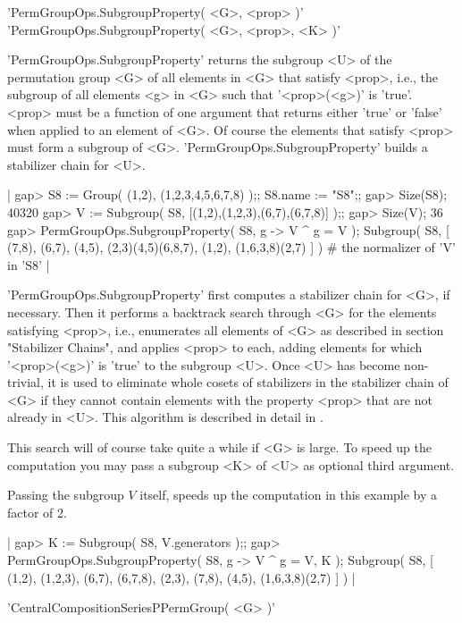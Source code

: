 'PermGroupOps.SubgroupProperty( <G>, <prop> )' \\
'PermGroupOps.SubgroupProperty( <G>, <prop>, <K> )'

'PermGroupOps.SubgroupProperty'   returns  the   subgroup  <U>   of   the
permutation group  <G> of  all elements in <G> that satisfy <prop>, i.e.,
the  subgroup  of  all elements  <g> in <G>  such  that  '<prop>(<g>)' is
'true'.  <prop> must be a function of  one  argument  that returns either
'true' or 'false'  when applied  to an element  of  <G>.  Of  course  the
elements   that   satisfy   <prop>   must  form   a   subgroup  of   <G>.
'PermGroupOps.SubgroupProperty' builds a stabilizer chain for <U>.

|    gap> S8 := Group( (1,2), (1,2,3,4,5,6,7,8) );;  S8.name := "S8";;
    gap> Size(S8);
    40320
    gap> V := Subgroup( S8, [(1,2),(1,2,3),(6,7),(6,7,8)] );;
    gap> Size(V);
    36
    gap> PermGroupOps.SubgroupProperty( S8, g -> V ^ g = V );
    Subgroup( S8, [ (7,8), (6,7), (4,5), (2,3)(4,5)(6,8,7), (1,2),
      (1,6,3,8)(2,7) ] )
    # the normalizer of 'V' in 'S8' |

'PermGroupOps.SubgroupProperty'  first  computes a  stabilizer chain  for
<G>, if necessary.  Then it performs a backtrack search  through  <G> for
the elements  satisfying <prop>, i.e.,  enumerates all elements of <G> as
described in  section  "Stabilizer Chains",  and  applies <prop> to each,
adding elements for which '<prop>(<g>)' is 'true' to  the  subgroup  <U>.
Once <U> has  become non-trivial, it is used to eliminate whole cosets of
stabilizers  in the stabilizer  chain  of  <G>  if  they  cannot  contain
elements  with  the  property  <prop> that are not already  in <U>.  This
algorithm is described in detail in \cite{But82}.

This search will of course take quite a while if  <G> is large.  To speed
up the  computation you may pass a subgroup  <K> of <U> as optional third
argument.

Passing  the subgroup $V$  itself,  speeds  up  the  computation in  this
example by a factor of 2.

|    gap> K := Subgroup( S8, V.generators );;
    gap> PermGroupOps.SubgroupProperty( S8, g -> V ^ g = V, K );
    Subgroup( S8, [ (1,2), (1,2,3), (6,7), (6,7,8), (2,3), (7,8), (4,5),
      (1,6,3,8)(2,7) ] ) |


'CentralCompositionSeriesPPermGroup( <G> )'

